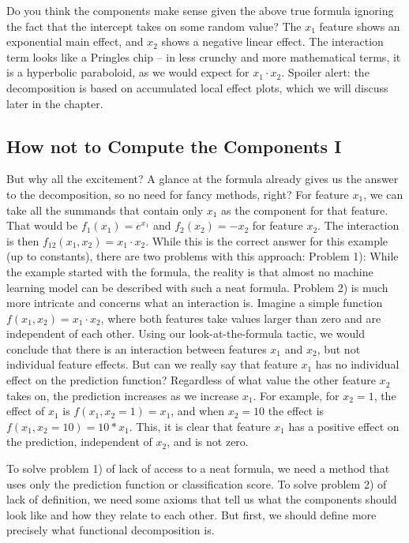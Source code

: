 \documentclass[
  12pt,
]{krantz}
\begin{document}
Do you think the components make sense given the above true formula ignoring the fact that the intercept takes on some random value?
The \(x_1\) feature shows an exponential main effect, and \(x_2\) shows a negative linear effect.
The interaction term looks like a Pringles chip -- in less crunchy and more mathematical terms, it is a hyperbolic paraboloid, as we would expect for \(x_1 \cdot x_2\).
Spoiler alert: the decomposition is based on accumulated local effect plots, which we will discuss later in the chapter.

\hypertarget{how-not-to-compute-the-components-i}{%
\subsection{How not to Compute the Components I}\label{how-not-to-compute-the-components-i}}

But why all the excitement?
A glance at the formula already gives us the answer to the decomposition, so no need for fancy methods, right?
For feature \(x_1\), we can take all the summands that contain only \(x_1\) as the component for that feature.
That would be \(f_1(x_1) = e^{x_1}\) and \(f_2(x_2) = -x_2\) for feature \(x_2\).
The interaction is then \(f_{12}(x_{1},x_{2}) = x_1 \cdot x_2\).
While this is the correct answer for this example (up to constants), there are two problems with this approach:
Problem 1): While the example started with the formula, the reality is that almost no machine learning model can be described with such a neat formula.
Problem 2) is much more intricate and concerns what an interaction is.
Imagine a simple function \(f(x_1,x_2) = x_1 \cdot x_2\), where both features take values larger than zero and are independent of each other.
Using our look-at-the-formula tactic, we would conclude that there is an interaction between features \(x_1\) and \(x_2\), but not individual feature effects.
But can we really say that feature \(x_1\) has no individual effect on the prediction function?
Regardless of what value the other feature \(x_2\) takes on, the prediction increases as we increase \(x_1\).
For example, for \(x_2 = 1\), the effect of \(x_1\) is \(f(x_1, x_2 = 1) = x_1\), and when \(x_2 = 10\) the effect is \(f(x_1, x_2 = 10) = 10 * x_1\).
This, it is clear that feature \(x_1\) has a positive effect on the prediction, independent of \(x_2\), and is not zero.

To solve problem 1) of lack of access to a neat formula, we need a method that uses only the prediction function or classification score.
To solve problem 2) of lack of definition, we need some axioms that tell us what the components should look like and how they relate to each other.
But first, we should define more precisely what functional decomposition is.
\end{document}
